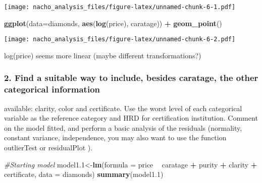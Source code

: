 \documentclass[]{article}
\newenvironment{Shaded}{\begin{snugshade}}{\end{snugshade}}
\newcommand{\KeywordTok}[1]{\textcolor[rgb]{0.13,0.29,0.53}{\textbf{#1}}}
\newcommand{\DataTypeTok}[1]{\textcolor[rgb]{0.13,0.29,0.53}{#1}}
\newcommand{\DecValTok}[1]{\textcolor[rgb]{0.00,0.00,0.81}{#1}}
\newcommand{\StringTok}[1]{\textcolor[rgb]{0.31,0.60,0.02}{#1}}
\newcommand{\CommentTok}[1]{\textcolor[rgb]{0.56,0.35,0.01}{\textit{#1}}}
\newcommand{\OperatorTok}[1]{\textcolor[rgb]{0.81,0.36,0.00}{\textbf{#1}}}
\newcommand{\NormalTok}[1]{#1}
\begin{document}
\texttt{[image: nacho\_analysis\_files/figure-latex/unnamed-chunk-6-1.pdf]}

\begin{Shaded}
\begin{Highlighting}[]
\KeywordTok{ggplot}\NormalTok{(}\DataTypeTok{data=}\NormalTok{diamonds, }\KeywordTok{aes}\NormalTok{(}\KeywordTok{log}\NormalTok{(price), caratage)) }\OperatorTok{+}\StringTok{ }
\StringTok{        }\KeywordTok{geom_point}\NormalTok{()}
\end{Highlighting}
\end{Shaded}

\texttt{[image: nacho\_analysis\_files/figure-latex/unnamed-chunk-6-2.pdf]}

log(price) seems more linear (maybe different transformations?)

\subsubsection{2. Find a suitable way to include, besides caratage, the
other categorical
information}\label{find-a-suitable-way-to-include-besides-caratage-the-other-categorical-information}

available: clarity, color and certificate. Use the worst level of each
categorical variable as the reference category and HRD for certification
institution. Comment on the model fitted, and perform a basic analysis
of the residuals (normality, constant variance, independence, you may
also want to use the function outlierTest or residualPlot ).

\begin{Shaded}
\begin{Highlighting}[]
\CommentTok{#Starting model}
\NormalTok{model1.}\DecValTok{1}\NormalTok{<-}\KeywordTok{lm}\NormalTok{(}\DataTypeTok{formula =}\NormalTok{ price }\OperatorTok{~}\StringTok{ }\NormalTok{caratage }\OperatorTok{+}\StringTok{ }\NormalTok{purity }\OperatorTok{+}\StringTok{ }\NormalTok{clarity }\OperatorTok{+}\StringTok{ }\NormalTok{certificate, }\DataTypeTok{data =}\NormalTok{ diamonds)}
\KeywordTok{summary}\NormalTok{(model1.}\DecValTok{1}\NormalTok{)}
\end{Highlighting}
\end{Shaded}
\end{document}
